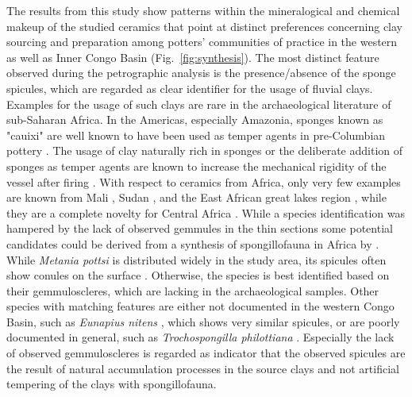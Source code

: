 \documentclass[preprint,10pt,oneside,onecolumn,authoryear]{elsarticle}
\begin{document}
The results from this study show patterns within the mineralogical and chemical makeup of the studied ceramics that point at distinct preferences concerning clay sourcing and preparation among potters' communities of practice in the western as well as Inner Congo Basin (Fig.~\ref{fig:synthesis}). The most distinct feature observed during the petrographic analysis is the presence/absence of the sponge spicules, which are regarded as clear identifier for the usage of fluvial clays. Examples for the usage of such clays are rare in the archaeological literature of sub-Saharan Africa. In the Americas, especially Amazonia, sponges known as "cauixi" are well known to have been used as temper agents in pre-Columbian pottery \citep{Linne.1932,Linne.1957,Cordell.1993,Costa.2004,Ottalagano.2016,Rodrigues.2017,Bloch.2019,LozadaMendieta.2019,Villagran.2022}. The usage of clay naturally rich in sponges or the deliberate addition of sponges as temper agents are known to increase the mechanical rigidity of the vessel after firing \citep{Natalio.2015}. With respect to ceramics from Africa, only very few examples are known from Mali \citep{Brissaud.1986,Mcintosh.1989,Nixon.2017}, Sudan \citep{Adamson.1987}, and the East African great lakes region \citep[185]{Ashley.2005}, while they are a complete novelty for Central Africa \citep{Seidensticker.2025}. While a species identification was hampered by the lack of observed gemmules in the thin sections some potential candidates could be derived from a synthesis of spongillofauna in Africa by \citet{Manconi.2009}. While \textit{Metania pottsi} is distributed widely in the study area, its spicules often show conules on the surface \citep[38--47]{Manconi.2009}. Otherwise, the species is best identified based on their gemmuloscleres, which are lacking in the archaeological samples. Other species with matching features are either not documented in the western Congo Basin, such as \textit{Eunapius nitens} \citep[149--151]{Manconi.2009}, which shows very similar spicules, or are poorly documented in general, such as \textit{Trochospongilla philottiana} \citep[198--199]{Manconi.2009}. Especially the lack of observed gemmuloscleres is regarded as indicator that the observed spicules are the result of natural accumulation processes in the source clays and not artificial tempering of the clays with spongillofauna. 
\end{document}
